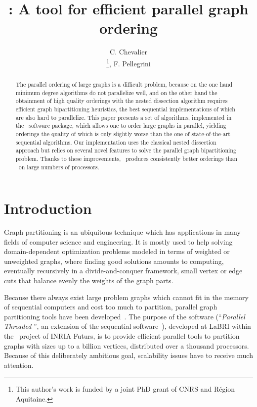 \documentclass[fleqn,12pt,twoside]{article}
\title{\ptscotch: A tool for efficient parallel graph ordering}
\author{C. Chevalier\address[LaBRI]{LaBRI \& Project ScAlApplix of INRIA Futurs\\
        351, cours de la Lib\'eration, 33400 Talence, France}\thanks{This author's work is funded by a joint PhD grant of CNRS and R\'egion Aquitaine.},
        F. Pellegrini\address[ENSEIRB]{ENSEIRB, LaBRI \& Project ScAlApplix of INRIA Futurs\\
        351, cours de la Lib\'eration, 33400 Talence, France\\
        {\tt \{cchevali|pelegrin\}@labri.fr}}}
\begin{document}
\maketitle

\begin{abstract}
The parallel ordering of large graphs is a difficult problem, because
on the one hand minimum degree algorithms do not parallelize well, and
on the other hand the obtainment of high quality orderings with the nested
dissection algorithm requires efficient graph bipartitioning heuristics,
the best sequential implementations of which are also hard to
parallelize.
This paper presents a set of algorithms, implemented in the \ptscotch\
software package, which allows one to order large graphs in parallel,
yielding orderings the quality of which is only slightly worse than
the one of state-of-the-art sequential algorithms. Our implementation
uses the classical nested dissection approach but relies on several
novel features to solve the parallel graph bipartitioning
problem. Thanks to these improvements, \ptscotch\ produces
consistently better orderings than \parmetis\ on large numbers of
processors.
\end{abstract}







\section{Introduction}

Graph partitioning is an ubiquitous technique which has applications
in many fields of computer science and engineering. It is mostly used
to help solving domain-dependent optimization problems modeled in
terms of weighted or unweighted graphs, where finding good solutions
amounts to computing, eventually recursively in a divide-and-conquer
framework, small vertex or edge cuts that balance evenly the weights
of the graph parts.

Because there always exist large problem graphs which cannot fit in
the memory of sequential computers and cost too much to partition,
parallel graph partitioning tools have been
developed~\cite{webmetis-parmetis,webjostle}.
The purpose of the \ptscotch{} software (``{\it Parallel Threaded
\scotch}'', an extension of the sequential \scotch{}
software~\cite{webscotch}), developed at LaBRI within the \scalapplix\
project of INRIA Futurs, is to provide efficient parallel tools to
partition graphs with sizes up to a billion vertices, distributed over
a thousand processors. Because of this deliberately ambitious goal,
scalability issues have to receive much attention.
\end{document}

